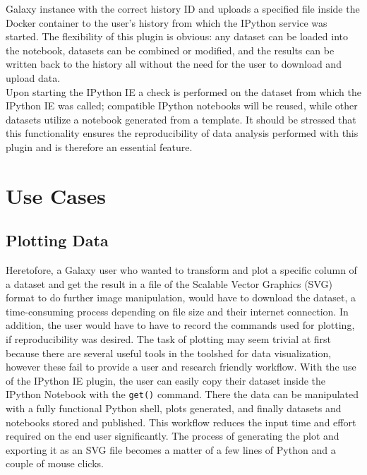 \documentclass{bioinfo}
\begin{document}
\begin{methods}
Galaxy instance with the correct history ID and uploads a specified file inside the Docker container to the user's
history from which the IPython service was started. The flexibility of this plugin is obvious: any dataset can be
loaded into the notebook, datasets can be combined or modified, and the results can be written back to the history
all without the need for the user to download and upload data. \\
Upon starting the IPython IE a check is performed on the dataset from which the IPython IE was called; compatible IPython
notebooks will be reused, while other datasets utilize a notebook generated from a template. It should be stressed that
this functionality ensures the reproducibility of data analysis performed with this plugin and is therefore an essential
feature.


\section{Use Cases}
\subsection{Plotting Data}
Heretofore, a Galaxy user who wanted to transform and plot a specific column of a dataset and
get the result in a file of the Scalable Vector Graphics (SVG) format to do further image manipulation,
would have to download the dataset, a time-consuming process depending on file size and their internet
connection. In addition, the user would have to have to record the commands used for plotting, if reproducibility was desired.
The task of plotting may seem trivial at first because there are several useful tools in the toolshed for data visualization,
however these fail to provide a user and research friendly workflow. With the use of the IPython IE plugin, the user
can easily copy their dataset inside the IPython Notebook with the \texttt{get()} command. There the data can be manipulated 
with a fully functional Python shell, plots generated, and finally datasets and notebooks stored and published.
This workflow reduces the input time and effort required on the end user significantly.
The process of generating the plot
and exporting it as an SVG file becomes a matter of a few lines of Python and a couple of mouse clicks.


\end{methods}
\end{document}

